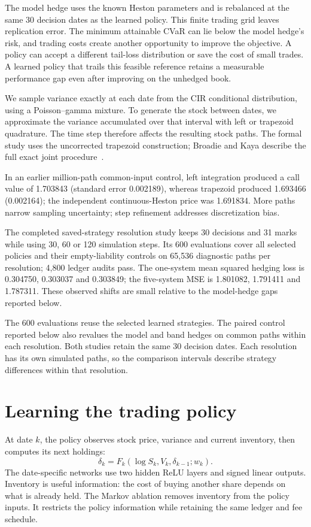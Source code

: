 \documentclass[8pt]{strategynet-journal}
\begin{document}
\begin{SNcolumns}
The model hedge uses the known Heston parameters and is rebalanced at the
same 30 decision dates
as the learned policy. This finite trading grid leaves replication error.
The minimum attainable CVaR can lie below the model hedge's risk, and trading
costs create another opportunity to improve the objective. A policy can
accept a different tail-loss distribution or save the cost of small trades.
A learned policy that trails this feasible reference retains a measurable
performance gap even after improving on the unhedged book.

We sample variance exactly at each date from the CIR conditional distribution,
using a Poisson--gamma mixture. To generate the stock between dates, we
approximate the variance accumulated over that interval with left or trapezoid
quadrature. The time step therefore affects the resulting stock paths. The
formal study uses the uncorrected trapezoid construction; Broadie and Kaya
describe the full exact joint procedure~\cite{bk,ajk}.

In an earlier million-path common-input control,
left integration produced a call value of 1.703843 (standard error 0.002189),
whereas trapezoid produced 1.693466 (0.002164); the independent continuous-Heston
price was 1.691834. More paths narrow sampling uncertainty; step refinement addresses
discretization bias.

The completed saved-strategy resolution study keeps 30 decisions and 31 marks while
using 30, 60 or 120 simulation steps. Its 600 evaluations cover all selected policies
and their empty-liability controls on 65,536 diagnostic paths per resolution;
4,800 ledger audits pass. The one-system mean squared hedging loss is 0.304750, 0.303037 and
0.303849; the five-system MSE is 1.801082, 1.791411 and 1.787311. These observed shifts are small relative to the model-hedge gaps reported below.

The 600 evaluations reuse the selected learned strategies. The paired control
reported below also revalues the model and band hedges on common paths within
each resolution. Both studies retain the same 30 decision dates. Each
resolution has its own simulated paths, so the comparison intervals describe
strategy differences within that resolution.

\section{Learning the trading policy}
At date $k$, the policy observes stock price, variance and current inventory,
then computes its next holdings:
\[
 \delta_k=F_k(\log S_k,V_k,\delta_{k-1};w_k).
\]
The date-specific networks use two hidden ReLU layers and signed linear outputs.
Inventory is useful information: the cost of buying another share depends on
what is already held. The Markov ablation removes inventory from the policy
inputs. It restricts the policy information while retaining the same ledger and
fee schedule.


\end{SNcolumns}
\end{document}
